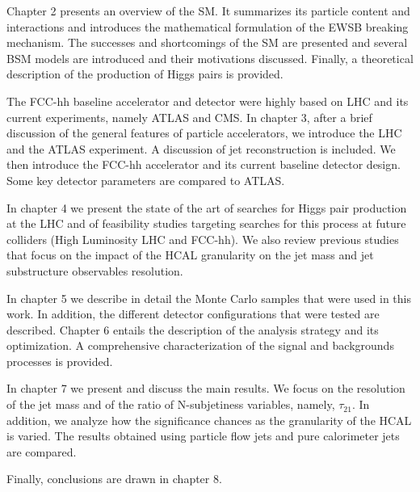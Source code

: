 Chapter 2 presents an overview of the SM. It summarizes its particle content and interactions and introduces the mathematical formulation of the EWSB breaking mechanism. The successes and shortcomings of the SM are presented and several BSM models are introduced and their motivations discussed. Finally, a theoretical description of the production of Higgs pairs is provided.

The FCC-hh baseline accelerator and detector were highly based on LHC and its current experiments, namely ATLAS and CMS. In chapter 3, after a brief discussion of the general features of particle accelerators, we introduce the LHC and the ATLAS experiment. A discussion of jet reconstruction is included. We then introduce the FCC-hh accelerator and its current baseline detector design. Some key detector parameters are compared to ATLAS.

In chapter 4 we present the state of the art of searches for Higgs pair production at the LHC and of feasibility studies targeting searches for this process at future colliders (High Luminosity LHC and FCC-hh). We also review previous studies that focus on the impact of the HCAL granularity on the jet mass and jet substructure observables resolution.

In chapter 5 we describe in detail the Monte Carlo samples that were used in this work. In addition, the different detector configurations that were tested are described. Chapter 6 entails the description of the analysis strategy and its optimization. A comprehensive characterization of the signal and backgrounds processes is provided. 

In chapter 7 we present and discuss the main results. We focus on the resolution of the jet mass and of the ratio of N-subjetiness variables, namely, $\tau_{21}$. In addition, we analyze how the significance chances as the granularity of the HCAL is varied. The results obtained using particle flow jets and pure calorimeter jets are compared.

Finally, conclusions are drawn in chapter 8.


